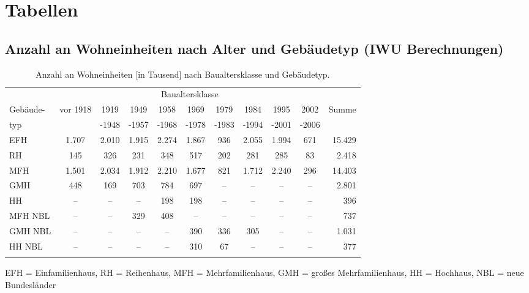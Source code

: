 \chapter{Tabellen}

\section{Anzahl an Wohneinheiten nach Alter und Gebäudetyp (IWU Berechnungen)}

\begin{table}[H]\centering
\begin{tabular}{l|ccccccccc|r}
\toprule[1.5pt]
 & \multicolumn{9}{c}{Baualtersklasse} &  \\ 
\cmidrule[1.5pt]{2-10}
Gebäude-& vor 1918 & 1919 & 1949 & 1958 & 1969 & 1979 & 1984 & 1995 & 2002 & Summe \\ 
typ & & -1948&-1957&-1968&-1978&-1983&-1994&-2001&-2006&\\ \addlinespace[5pt]
\midrule[2pt]
EFH & 1.707 & 2.010 & 1.915 & 2.274 & 1.867 & 936 & 2.055 & 1.994 & 671 & 15.429 \\
\midrule
RH & 145 & 326 & 231 & 348 & 517 & 202 & 281 & 285 & 83 & 2.418 \\
\midrule
MFH & 1.501 & 2.034 & 1.912 & 2.210 & 1.677 & 821 & 1.712 & 2.240 & 296 & 14.403 \\
\midrule
GMH & 448 & 169 & 703 & 784 & 697 & -- & -- & -- & -- & 2.801 \\
\midrule
HH & -- & -- & -- & 198 & 198 & -- & -- & -- & -- & 396 \\
\midrule
MFH NBL & -- & -- & 329 & 408 & -- & -- & -- & -- & -- & 737 \\
\midrule
GMH NBL & -- & -- & -- & -- & 390 & 336 & 305 & -- & -- & 1.031 \\
\midrule
HH NBL & -- & -- & -- & -- & 310 & 67 & -- & -- & -- & 377 \\
\bottomrule[1.5pt] \addlinespace[10pt]
\end{tabular}
\caption{Anzahl an Wohneinheiten [in Tausend] nach Baualtersklasse und Gebäudetyp. \cite{Diefenbach.12.11.2007}}
\label{tab: TabelleA0}
\end{table}

EFH = Einfamilienhaus, RH = Reihenhaus, MFH = Mehrfamilienhaus, GMH = großes Mehrfamilienhaus, HH = Hochhaus, NBL = neue Bundesländer

